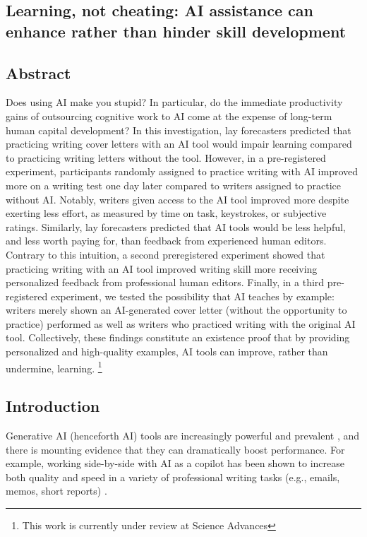 \documentclass[11pt]{report}
\begin{document}
\begin{mainf} %

\chapter{Learning, not cheating: AI assistance can enhance rather than hinder skill development}

\section{Abstract}
Does using AI make you stupid? In particular, do the immediate productivity gains of outsourcing cognitive work to AI come at the expense of long-term human capital development? In this investigation, lay forecasters predicted that practicing writing cover letters with an AI tool would impair learning compared to practicing writing letters without the tool. However, in a pre-registered experiment, participants randomly assigned to practice writing with AI improved more on a writing test one day later compared to writers assigned to practice without AI. Notably, writers given access to the AI tool improved more despite exerting less effort, as measured by time on task, keystrokes, or subjective ratings. Similarly, lay forecasters predicted that AI tools would be less helpful, and less worth paying for, than feedback from experienced human editors. Contrary to this intuition, a second preregistered experiment showed that practicing writing with an AI tool improved writing skill more receiving personalized feedback from professional human editors. Finally, in a third pre-registered experiment, we tested the possibility that AI teaches by example: writers merely shown an AI-generated cover letter (without the opportunity to practice) performed as well as writers who practiced writing with the original AI tool. Collectively, these findings constitute an existence proof that by providing personalized and high-quality examples, AI tools can improve, rather than undermine, learning. \footnote{This work is currently under review at Science Advances} 

\section{Introduction}

Generative AI (henceforth AI) tools are increasingly powerful and prevalent \cite{bubeck2023}, and there is mounting evidence that they can dramatically boost performance. 
  For example, working side-by-side with AI as a copilot has been shown to increase both quality and speed in a variety of professional writing tasks (e.g., emails, memos, short reports) \cite{noy2023, dellacqua2023, wiles2023algorithmic}.


\end{mainf}
\end{document}

